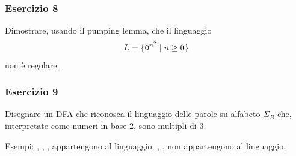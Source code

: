 \begin{frame}
	\frametitle{Esercizio 8}
	Dimostrare, usando il pumping lemma, che il linguaggio
	\[
		L = \{ \mathtt{0}^{n^{2}} \; \vert \; n \ge 0 \}
	\]
	non è regolare.
\end{frame}

\begin{frame}
        \frametitle{Esercizio 9}
	Disegnare un DFA che riconosca il linguaggio delle parole su alfabeto $\Sigma_{B}$
	che, interpretate come numeri in base 2, sono multipli di 3.

	\bigskip
	Esempi: \zero, \uno\uno, \uno\uno\zero, \uno\zero\zero\uno appartengono al linguaggio;
	\uno, \uno\zero, \uno\zero\zero non appartengono al linguaggio.
\end{frame}






                                       


